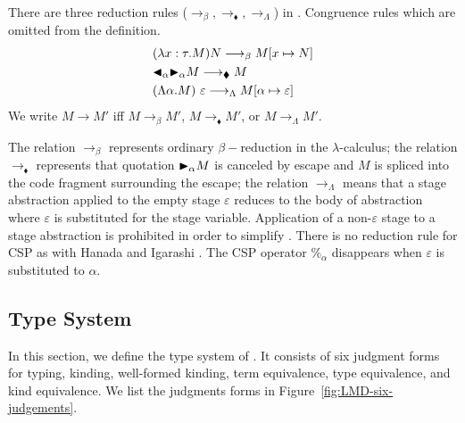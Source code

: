 \begin{definition}[Reduction]
	There are three reduction rules ($\longrightarrow_\beta, \longrightarrow_\blacklozenge, \longrightarrow_\Lambda$) in \LMD.
	Congruence rules which are omitted from the definition.
	\begin{align*}
		 & (\lambda x:\tau.M) N \longrightarrow_\beta M[x \mapsto N]                       \\
		 & {\mathop{\blacktriangleleft}}_\alpha {\mathop{\blacktriangleright}}_\alpha M \longrightarrow_\blacklozenge M                        \\
		 & (\Lambda \alpha.M)\ \varepsilon \longrightarrow_\Lambda M[\alpha \mapsto \varepsilon]
	\end{align*}
	We write $ M \longrightarrow M'$ iff $ M \longrightarrow_\beta M'$, $ M \longrightarrow_\blacklozenge M'$, or $ M \longrightarrow_\Lambda M'$.
\end{definition}

The relation $\longrightarrow_\beta$ represents ordinary $\beta-$reduction in the \(\lambda\)-calculus; the relation 
$\longrightarrow_\blacklozenge$ represents that quotation ${\mathop{\blacktriangleright}}_\alpha M$ is canceled by escape and $M$ is spliced into the code fragment surrounding the escape;
the relation $\longrightarrow_\Lambda$ means that a stage abstraction applied to the empty stage $\varepsilon$ reduces to the body of abstraction
where $\varepsilon$ is substituted for the stage variable.
Application of a non-$\varepsilon$ stage to a stage abstraction is prohibited in order to simplify \LMD. 
There is no reduction rule for CSP as with Hanada and Igarashi \cite{Hanada2014}.
The CSP operator $\%_\alpha$ disappears when $\varepsilon$ is substituted to $\alpha$.


\subsection{Type System}


In this section, we define the type system of \LMD.
It consists of six judgment forms for typing, kinding, well-formed kinding, term equivalence, type equivalence, and kind equivalence.
We list the judgments forms in Figure~\ref{fig:LMD-six-judgements}.

